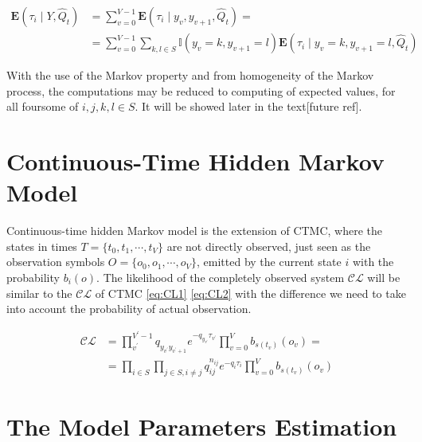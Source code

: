 \documentclass[thesis=M,english]{FITthesis}[2012/10/20]
\begin{document}
\begin{equation}
\begin{aligned}  
\mathbf{E}( \tau_i \mid Y, \hat Q_t ) &= \sum_{v=0}^{V-1} \mathbf{E}(\tau_i \mid y_v, y_{v+1}, \hat Q_t ) = \\
&= \sum_{v=0}^{V-1} \sum_{k,l \in S} \mathbb{I}( y_v = k, y_{v+1} = l ) \mathbf{E}(\tau_i \mid y_v = k, y_{v+1} = l, \hat Q_t )
\end{aligned}
\end{equation}
   
With the use of the Markov property and from homogeneity of the Markov process, the computations may be reduced to computing of expected values, for all foursome of $i,j,k,l \in S$. It will be showed later in the text[future ref].     
   
\section{Continuous-Time Hidden Markov Model}

Continuous-time hidden Markov model is the extension of CTMC, where the states in times $T = \{ t_0, t_1, \cdots, t_{V} \}$ are not directly observed, just seen as the observation symbols $O = \{  o_0, o_1, \cdots, o_{V} \}$, emitted by the current state $i$ with the probability $b_i(o)$.
The likelihood of the completely observed system  $\mathcal{CL}$ will be similar to the $\mathcal{CL}$ of CTMC \eqref{eq:CL1} \eqref{eq:CL2} with the difference we need to take into account the probability of actual observation.

\begin{equation}\label{eq:HMCL1}
\begin{aligned}  
 \mathcal{CL} &= \prod_{v^{'}}^{V^{'}-1} q_{y_{v^{'}} y_{v^{'}+1}} e^{ - q_{y_{v^{'}}} \tau_{v^{'}} } 
    \prod_{v=0}^V b_{s(t_v)}(o_v) = \\
    &= \prod_{i \in S} \prod_{j \in S, i \neq j} q_{ij}^{n_{ij} } e^{ - q_i \tau_i } \prod_{v=0}^V b_{s(t_v)}(o_v)
\end{aligned}
\end{equation}



\section{The Model Parameters Estimation}
\end{document}
